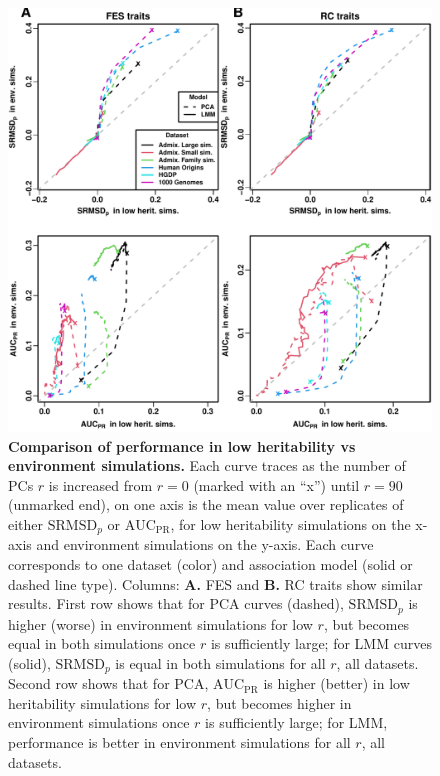 \documentclass[11pt]{article}
\newcommand{\rmsd}{\text{SRMSD}_p}
\newcommand{\auc}{\text{AUC}_\text{PR}}
\begin{document}
\begin{figure}[hp!]
  \centering
  \includegraphics[width=\textwidth,height=0.7\textheight,keepaspectratio]{low-herit-vs-env.pdf}
  \caption{
    {\bf Comparison of performance in low heritability vs environment simulations.}
    Each curve traces as the number of PCs $r$ is increased from $r=0$ (marked with an ``x'') until $r=90$ (unmarked end), on one axis is the mean value over replicates of either $\rmsd$ or $\auc$, for low heritability simulations on the x-axis and environment simulations on the y-axis.
    Each curve corresponds to one dataset (color) and association model (solid or dashed line type).
    Columns: \textbf{A.} FES and \textbf{B.} RC traits show similar results.
    First row shows that for PCA curves (dashed), $\rmsd$ is higher (worse) in environment simulations for low $r$, but becomes equal in both simulations once $r$ is sufficiently large; for LMM curves (solid), $\rmsd$ is equal in both simulations for all $r$, all datasets.
    Second row shows that for PCA, $\auc$ is higher (better) in low heritability simulations for low $r$, but becomes higher in environment simulations once $r$ is sufficiently large; for LMM, performance is better in environment simulations for all $r$, all datasets.
  }
  \label{fig:low-herit-vs-env}
\end{figure}
\end{document}
